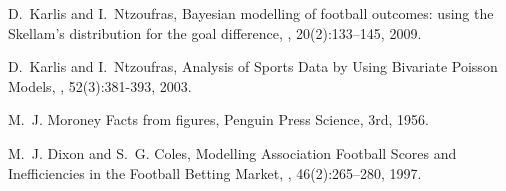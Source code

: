 \begin{thebibliography}{}
D.~Karlis and I.~Ntzoufras,
\newblock Bayesian modelling of football outcomes: using the {S}kellam's distribution
	for the goal difference,
, 20(2):133--145, 2009.

D.~Karlis and I.~Ntzoufras,
\newblock Analysis of Sports Data by Using Bivariate {P}oisson Models,
, 52(3):381-393, 2003.

M.~J. Moroney
\newblock Facts from figures,
\newblock Penguin Press Science, 3rd, 1956.

M.~J. Dixon and S.~G. Coles,
\newblock Modelling Association Football Scores and Inefficiencies in the Football Betting Market,
, 46(2):265--280, 1997.

\end{thebibliography}